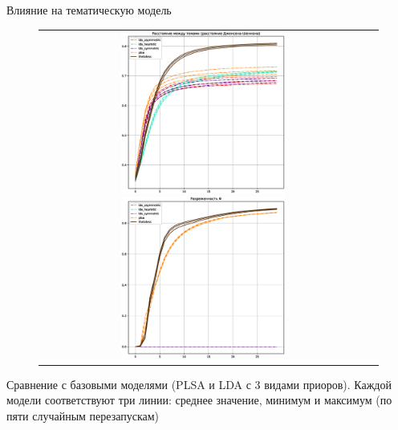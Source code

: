 \begin{frame}{Влияние на тематическую модель}

\begin{figure}
\setlength\tabcolsep{0pt} %
\begin{tabular}{cc}
\includegraphics[width=54mm]{images/CH4_baselines_diversity_jensenshannon_False.eps}
\includegraphics[width=54mm]{images/CH4_baselines_SparsityPhiScore.eps}& \end{tabular}
\end{figure}
Сравнение с базовыми моделями (PLSA и LDA с 3 видами приоров). Каждой модели соответствуют три линии: среднее значение, минимум и максимум (по пяти случайным перезапускам)
\end{frame}

